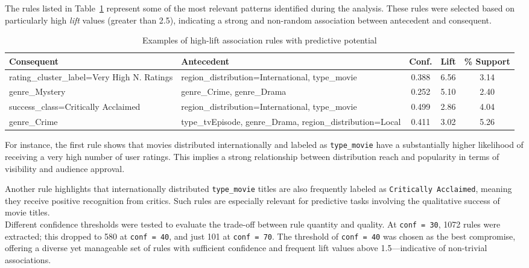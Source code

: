 \documentclass[10pt]{article}
\begin{document}
The rules listed in Table~\ref{tab:regole_lift_alto} represent some of the most relevant patterns identified during the analysis. These rules were selected based on particularly high \textit{lift} values (greater than 2.5), indicating a strong and non-random association between antecedent and consequent.

\begin{table}[H]
\centering
\caption{Examples of high-lift association rules with predictive potential}
\label{tab:regole_lift_alto}
\begin{tabular}{|p{4.2cm}|p{5.5cm}|c|c|c|}
\hline
\textbf{Consequent} & \textbf{Antecedent} & \textbf{Conf.} & \textbf{Lift} & \textbf{\% Support} \\
\hline
rating\_cluster\_label=Very High N. Ratings & region\_distribution=International, type\_movie & 0.388 & 6.56 & 3.14 \\
\hline
genre\_Mystery & genre\_Crime, genre\_Drama & 0.252 & 5.10 & 2.40 \\
\hline
success\_class=Critically Acclaimed & region\_distribution=International, type\_movie & 0.499 & 2.86 & 4.04 \\
\hline
genre\_Crime & type\_tvEpisode, genre\_Drama, region\_distribution=Local & 0.411 & 3.02 & 5.26 \\
\hline
\end{tabular}
\end{table}

For instance, the first rule shows that movies distributed internationally and labeled as \texttt{type\_movie} have a substantially higher likelihood of receiving a very high number of user ratings. This implies a strong relationship between distribution reach and popularity in terms of visibility and audience approval.

Another rule highlights that internationally distributed \texttt{type\_movie} titles are also frequently labeled as \texttt{Critically Acclaimed}, meaning they receive positive recognition from critics. Such rules are especially relevant for predictive tasks involving the qualitative success of movie titles.\\

Different confidence thresholds were tested to evaluate the trade-off between rule quantity and quality. At \texttt{conf = 30}, 1072 rules were extracted; this dropped to 580 at \texttt{conf = 40}, and just 101 at \texttt{conf = 70}. The threshold of \texttt{conf = 40} was chosen as the best compromise, offering a diverse yet manageable set of rules with sufficient confidence and frequent lift values above 1.5—indicative of non-trivial associations.
\end{document}
